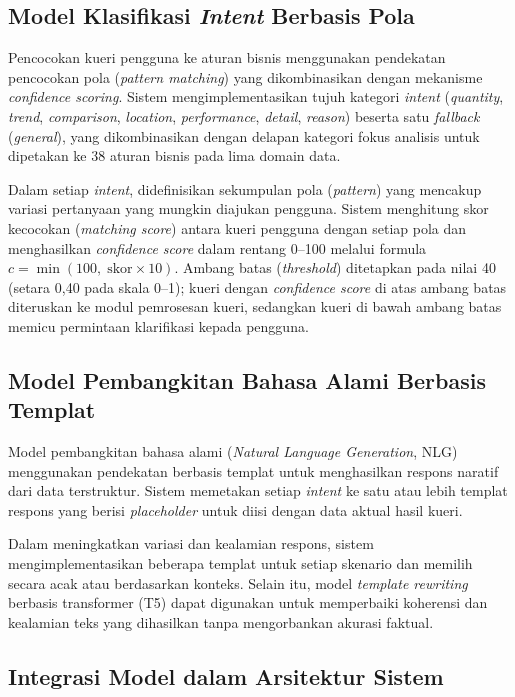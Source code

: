 \subsection{Model Klasifikasi \textit{Intent} Berbasis Pola}
\label{subsec:model-intent}

Pencocokan kueri pengguna ke aturan bisnis menggunakan pendekatan pencocokan pola (\textit{pattern matching}) yang dikombinasikan dengan mekanisme \textit{confidence scoring}. Sistem mengimplementasikan tujuh kategori \textit{intent} (\textit{quantity}, \textit{trend}, \textit{comparison}, \textit{location}, \textit{performance}, \textit{detail}, \textit{reason}) beserta satu \textit{fallback} (\textit{general}), yang dikombinasikan dengan delapan kategori fokus analisis untuk dipetakan ke 38 aturan bisnis pada lima domain data.

Dalam setiap \textit{intent}, didefinisikan sekumpulan pola (\textit{pattern}) yang mencakup variasi pertanyaan yang mungkin diajukan pengguna. Sistem menghitung skor kecocokan (\textit{matching score}) antara kueri pengguna dengan setiap pola dan menghasilkan \textit{confidence score} dalam rentang 0--100 melalui formula $c = \min(100,\;\text{skor} \times 10)$. Ambang batas (\textit{threshold}) ditetapkan pada nilai 40 (setara 0{,}40 pada skala 0--1); kueri dengan \textit{confidence score} di atas ambang batas diteruskan ke modul pemrosesan kueri, sedangkan kueri di bawah ambang batas memicu permintaan klarifikasi kepada pengguna.

\subsection{Model Pembangkitan Bahasa Alami Berbasis Templat}
\label{subsec:model-nlg}

Model pembangkitan bahasa alami (\textit{Natural Language Generation}, NLG) menggunakan pendekatan berbasis templat untuk menghasilkan respons naratif dari data terstruktur. Sistem memetakan setiap \textit{intent} ke satu atau lebih templat respons yang berisi \textit{placeholder} untuk diisi dengan data aktual hasil kueri.

Dalam meningkatkan variasi dan kealamian respons, sistem mengimplementasikan beberapa templat untuk setiap skenario dan memilih secara acak atau berdasarkan konteks. Selain itu, model \textit{template rewriting} berbasis transformer (T5) dapat digunakan untuk memperbaiki koherensi dan kealamian teks yang dihasilkan tanpa mengorbankan akurasi faktual.

\subsection{Integrasi Model dalam Arsitektur Sistem}
\label{subsec:integrasi-model}

